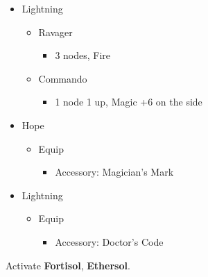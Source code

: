 \begin{menu}
\begin{itemize}
    \crystarium
    \begin{itemize}
        \item Lightning
        \begin{itemize}
            \item Ravager
            \begin{itemize}
                \item 3 nodes, Fire
            \end{itemize}
            \item Commando
            \begin{itemize}
                \item 1 node 1 up, Magic +6 on the side
            \end{itemize}
        \end{itemize}
    \end{itemize}
    \equip
    \begin{itemize}
        \item Hope
        \begin{itemize}
            \item Equip
            \begin{itemize}
                \item Accessory: Magician's Mark
            \end{itemize}
        \end{itemize}
        \item Lightning
        \begin{itemize}
            \item Equip
            \begin{itemize}
                \item Accessory: Doctor's Code
            \end{itemize}
        \end{itemize}
    \end{itemize}
\end{itemize}
\end{menu}
Activate \textbf{Fortisol}, \textbf{Ethersol}.

